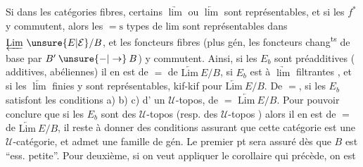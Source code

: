 
Si dans les catégories fibres, certains  $\underrightarrow{\lim}$ ou $\underleftarrow{\lim}$
sont représentables, et si les $f^*$ y commutent,
alors les $=\mathrm{s}$ types de lim sont représentables
dans $\underleftarrow{\mathrm{Lim}}\ \unsure{E|\mathcal E}/B$, et les foncteurs fibres (plus
gén, les foncteurs chang\textsuperscript{ts} de base par 
$B'\mathbin{\unsure{-|\to}}B$) y commutent. Ainsi, si les $E_b$\unsure{/|{}}
sont préadditives ( additives, abéliennes)  il en est
de $=$ de \deleted{$\unsure{\Gamma}$} $\underleftarrow{\mathrm{Lim}}\ E/B$, si $E_b$ est à  $\underrightarrow{\lim}$ filtrantes
, et si les $\underleftarrow{\lim}$ finies y sont représentables,
 kif-kif pour $\underleftarrow{\mathrm{Lim}}\ E/B$. De $=$, si les $E_b$
satisfont  les conditions a) b) c)  d'
un $\mathcal U$-topos,  de $=$ $\underleftarrow{\mathrm{Lim}}\ E/B$. Pour pouvoir
conclure que si les $E_b$ sont des $\mathcal U$-topos
(resp. des $\mathcal U$-topos )  alors il en est de
$=$ de \deleted{$\unsure{\Gamma}$} $\underleftarrow{\mathrm{Lim}}\ E/B$, il reste à donner des
conditions assurant que cette catégorie est une
$\mathcal U$-catégorie, et admet une  famille de gén.
Le premier pt sera assuré dès que $B$ est
``ess. petite''. Pour  deuxième, si on veut
appliquer le corollaire qui précède, on est

